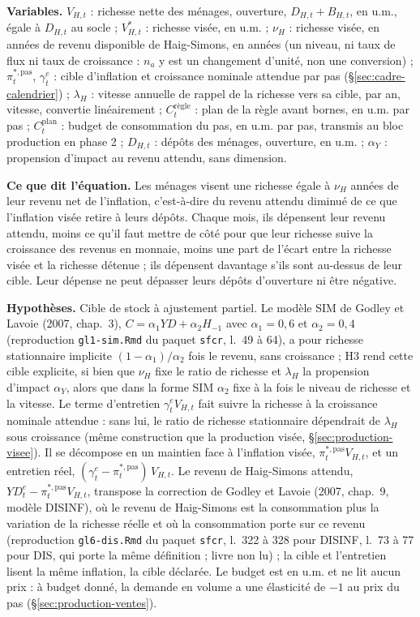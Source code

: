 \documentclass[11pt,a4paper]{article}
\newcommand{\variables}{\par\noindent\textbf{Variables.} }
\newcommand{\sens}{\par\noindent\textbf{Ce que dit l'équation.} }
\newcommand{\hyp}{\par\noindent\textbf{Hypothèses.} }
\begin{document}
\begin{proposee}
\variables $V_{H,t}$ : richesse nette des ménages, ouverture, $D_{H,t} + B_{H,t}$, en u.m., égale à $D_{H,t}$ au socle ; $V^\ast_{H,t}$ : richesse visée, en u.m. ; $\nu_H$ : richesse visée, en années de revenu disponible de Haig-Simons, en années (un niveau, ni taux de flux ni taux de croissance : $n_a$ y est un changement d'unité, non une conversion) ; $\pi^{\ast,\mathrm{pas}}_t$, $\gamma^e_t$ : cible d'inflation et croissance nominale attendue par pas (\S\ref{sec:cadre-calendrier}) ; $\lambda_H$ : vitesse annuelle de rappel de la richesse vers sa cible, par an, vitesse, convertie linéairement ; $C^{\text{règle}}_t$ : plan de la règle avant bornes, en u.m. par pas ; $C^{\mathrm{plan}}_t$ : budget de consommation du pas, en u.m. par pas, transmis au bloc production en phase 2 ; $D_{H,t}$ : dépôts des ménages, ouverture, en u.m. ; $\alpha_Y$ : propension d'impact au revenu attendu, sans dimension.
\sens Les ménages visent une richesse égale à $\nu_H$ années de leur revenu net de l'inflation, c'est-à-dire du revenu attendu diminué de ce que l'inflation visée retire à leurs dépôts. Chaque mois, ils dépensent leur revenu attendu, moins ce qu'il faut mettre de côté pour que leur richesse suive la croissance des revenus en monnaie, moins une part de l'écart entre la richesse visée et la richesse détenue ; ils dépensent davantage s'ils sont au-dessus de leur cible. Leur dépense ne peut dépasser leurs dépôts d'ouverture ni être négative.
\hyp Cible de stock à ajustement partiel. Le modèle SIM de Godley et Lavoie (2007, chap.~3), $C = \alpha_1 \mathit{YD} + \alpha_2 H_{-1}$ avec $\alpha_1 = 0{,}6$ et $\alpha_2 = 0{,}4$ (reproduction \nolinkurl{gl1-sim.Rmd} du paquet \texttt{sfcr}, l.~49 à 64), a pour richesse stationnaire implicite $(1 - \alpha_1)/\alpha_2$ fois le revenu, sans croissance ; H3 rend cette cible explicite, si bien que $\nu_H$ fixe le ratio de richesse et $\lambda_H$ la propension d'impact $\alpha_Y$, alors que dans la forme SIM $\alpha_2$ fixe à la fois le niveau de richesse et la vitesse. Le terme d'entretien $\gamma^e_t V_{H,t}$ fait suivre la richesse à la croissance nominale attendue : sans lui, le ratio de richesse stationnaire dépendrait de $\lambda_H$ sous croissance (même construction que la production visée, \S\ref{sec:production-visee}). Il se décompose en un maintien face à l'inflation visée, $\pi^{\ast,\mathrm{pas}}_t V_{H,t}$, et un entretien réel, $(\gamma^e_t - \pi^{\ast,\mathrm{pas}}_t)\,V_{H,t}$. Le revenu de Haig-Simons attendu, $\mathit{YD}^e_t - \pi^{\ast,\mathrm{pas}}_t V_{H,t}$, transpose la correction de Godley et Lavoie (2007, chap.~9, modèle DISINF), où le revenu de Haig-Simons est la consommation plus la variation de la richesse réelle et où la consommation porte sur ce revenu (reproduction \nolinkurl{gl6-dis.Rmd} du paquet \texttt{sfcr}, l.~322 à 328 pour DISINF, l.~73 à 77 pour DIS, qui porte la même définition ; livre non lu) ; la cible et l'entretien lisent la même inflation, la cible déclarée. Le budget est en u.m. et ne lit aucun prix : à budget donné, la demande en volume a une élasticité de $-1$ au prix du pas (\S\ref{sec:production-ventes}).

\end{proposee}
\end{document}
